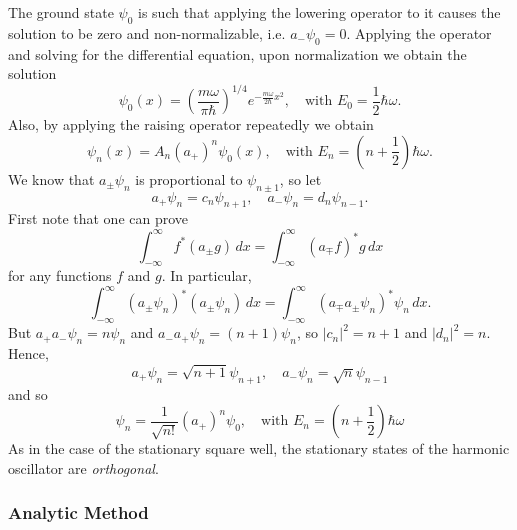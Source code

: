 \documentclass{article}
\begin{document}
The ground state $\psi_0$ is such that applying the lowering operator to it
causes the solution to be zero and non-normalizable, i.e. $a_-\psi_0 = 0$.
Applying the operator and solving for the differential equation, upon
normalization we obtain the solution \[
  \psi_0(x) = \left(\frac{m\omega}{\pi\hbar}\right)^{1/4}
  e^{-\frac{m\omega}{2\hbar}x^2},\quad
  \text{with } E_0 = \frac{1}{2}\hbar\omega.
\] Also, by applying the raising operator repeatedly we obtain \[
  \psi_n(x) = A_n(a_+)^n\psi_0(x), \quad
  \text{with } E_n = \left(n + \frac{1}{2}\right)\hbar\omega.
\] We know that $a_{\pm}\psi_n$ is proportional to $\psi_{n \pm 1}$, so let \[
  a_+\psi_n = c_n\psi_{n + 1}, \quad a_-\psi_n = d_n\psi_{n - 1}.
\] First note that one can prove \[
  \int_{-\infty}^{\infty} f^*(a_{\pm}g) \,dx
  = \int_{-\infty}^{\infty} (a_{\mp}f)^*g \,dx
\] for any functions $f$ and $g$. In particular, \[
  \int_{-\infty}^{\infty} (a_{\pm}\psi_n)^*(a_{\pm}\psi_n) \,dx
  = \int_{-\infty}^{\infty} (a_{\mp}a_{\pm}\psi_n)^*\psi_n \,dx.
\] But $a_+a_-\psi_n = n\psi_n$ and $a_-a_+\psi_n = (n + 1)\psi_n$, so $|c_n|^2
= n + 1$ and $|d_n|^2 = n$. Hence,
\begin{equation} \label{eq:har-osc-alg-op}
  \boxed{
    a_+\psi_n = \sqrt{n + 1}\psi_{n + 1}, \quad
    a_-\psi_n = \sqrt{n}\psi_{n - 1}
  }
\end{equation}
and so
\begin{equation} \label{eq:har-osc-alg-sta-st}
  \boxed{
    \psi_n = \frac{1}{\sqrt{n!}}(a_+)^n\psi_0, \quad
    \text{with } E_n = \left(n + \frac{1}{2}\right)\hbar\omega
  }
\end{equation}
As in the case of the stationary square well, the stationary states of the
harmonic oscillator are \emph{orthogonal}.

\subsubsection{Analytic Method}
\end{document}
